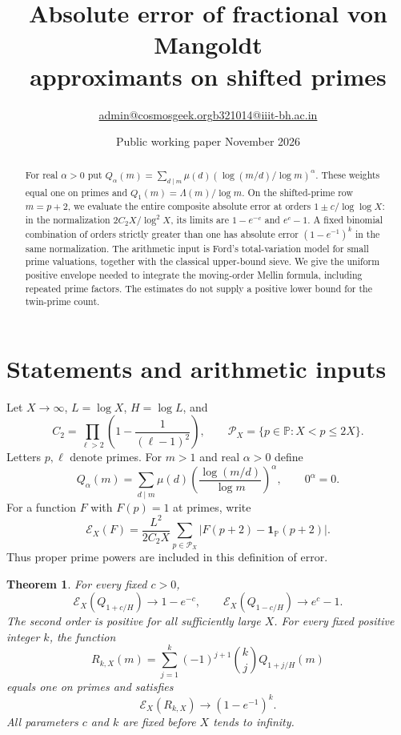 \documentclass[11pt]{article}
\title{\bfseries Absolute error of fractional von Mangoldt\\approximants on shifted primes}
\author{\small \href{mailto:admin@cosmosgeek.org}{admin@cosmosgeek.org}\qquad \href{mailto:b321014@iiit-bh.ac.in}{b321014@iiit-bh.ac.in}}
\date{\small Public working paper\quad 25 November 2026}
\newtheorem{theorem}{Theorem}[section]
\theoremstyle{remark}
\newcommand{\PP}{\mathbb P}
\newcommand{\one}{\mathbf 1}
\newcommand{\err}{\mathcal E_X}
\begin{document}
\maketitle

\begin{abstract}
For real $\alpha>0$ put
$Q_\alpha(m)=\sum_{d\mid m}\mu(d)(\log(m/d)/\log m)^\alpha$.
These weights equal one on primes and $Q_1(m)=\Lambda(m)/\log m$.
On the shifted-prime row $m=p+2$, we evaluate the entire composite
absolute error at orders $1\pm c/\log\log X$: in the normalization
$2C_2X/\log^2X$, its limits are $1-e^{-c}$ and $e^c-1$.
A fixed binomial combination of orders strictly greater than one has
absolute error $(1-e^{-1})^k$ in the same normalization.
The arithmetic input is Ford's total-variation model for small prime
valuations, together with the classical upper-bound sieve. We give the
uniform positive envelope needed to integrate the moving-order Mellin
formula, including repeated prime factors. The estimates do not supply
a positive lower bound for the twin-prime count.
\end{abstract}

\section{Statements and arithmetic inputs}
Let $X\to\infty$, $L=\log X$, $H=\log L$, and
\[
 C_2=\prod_{\ell>2}\left(1-\frac1{(\ell-1)^2}\right),\qquad
 \mathcal P_X=\{p\in\PP:X<p\le2X\}.
\]
Letters $p,\ell$ denote primes. For $m>1$ and real $\alpha>0$ define
\begin{equation}\label{eq:Q}
 Q_\alpha(m)=\sum_{d\mid m}\mu(d)
       \left(\frac{\log(m/d)}{\log m}\right)^\alpha,
 \qquad 0^\alpha=0.
\end{equation}
For a function $F$ with $F(p)=1$ at primes, write
\begin{equation}\label{eq:error}
 \err(F)=\frac{L^2}{2C_2X}\sum_{p\in\mathcal P_X}
        |F(p+2)-\one_{\PP}(p+2)|.
\end{equation}
Thus proper prime powers are included in this definition of error.

\begin{theorem}\label{th:critical}
For every fixed $c>0$,
\[
 \err(Q_{1+c/H})\longrightarrow1-e^{-c},\qquad
 \err(Q_{1-c/H})\longrightarrow e^c-1.
\]
The second order is positive for all sufficiently large $X$.
For every fixed positive integer $k$, the function
\begin{equation}\label{eq:Rk}
 R_{k,X}(m)=\sum_{j=1}^k(-1)^{j+1}\binom{k}{j}Q_{1+j/H}(m)
\end{equation}
equals one on primes and satisfies
\[
       \err(R_{k,X})\longrightarrow(1-e^{-1})^k.
\]
All parameters $c$ and $k$ are fixed before $X$ tends to infinity.
\end{theorem}
\end{document}
